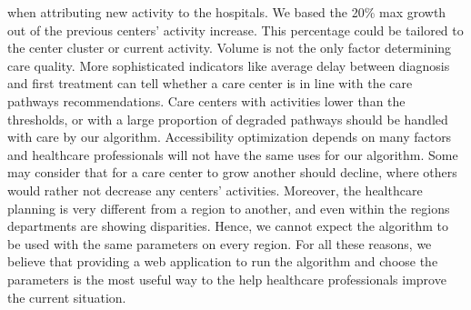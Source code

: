 when attributing new activity to the hospitals. We based the 20\% max growth out
of the previous centers' activity increase. This percentage could be tailored to
the center cluster or current activity. Volume is not the only factor
determining care quality. More sophisticated indicators like average delay
between diagnosis and first treatment can tell whether a care center is in line
with the care pathways recommendations. Care centers with activities lower than
the thresholds, or with a large proportion of degraded pathways should be
handled with care by our algorithm. Accessibility optimization depends on many
factors and healthcare professionals will not have the same uses for our
algorithm. Some may consider that for a care center to grow another should
decline, where others would rather not decrease any centers' activities.
Moreover, the healthcare planning is very different from a region to another,
and even within the regions departments are showing disparities. Hence, we
cannot expect the algorithm to be used with the same parameters on every region.
For all these reasons, we believe that providing a web application to run the
algorithm and choose the parameters is the most useful way to the help
healthcare professionals improve the current situation.

